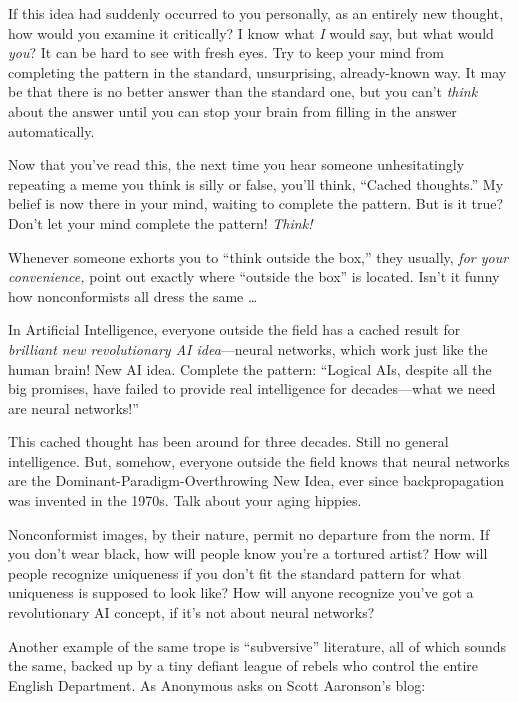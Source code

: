 {
 If this idea had suddenly occurred to you personally, as an
entirely new thought, how would you examine it critically? I know what
\textit{I} would say, but what would \textit{you}? It can be hard to
see with fresh eyes. Try to keep your mind from completing the pattern
in the standard, unsurprising, already-known way. It may be that there
is no better answer than the standard one, but you
can't \textit{think} about the answer until you can
stop your brain from filling in the answer automatically.}

{
 Now that you've read this, the next time you hear
someone unhesitatingly repeating a meme you think is silly or false,
you'll think, ``Cached
thoughts.'' My belief is now there in your mind,
waiting to complete the pattern. But is it true? Don't
let your mind complete the pattern! \textit{Think!}}

\myendsectiontext


{
 Whenever someone exhorts you to ``think outside
the box,'' they usually, \textit{for your
convenience,} point out exactly where ``outside the
box'' is located. Isn't it funny how
nonconformists all dress the same \ldots }

{
 In Artificial Intelligence, everyone outside the field has a
cached result for \textit{brilliant new revolutionary AI
idea}{}---neural networks, which work just like the human brain! New AI
idea. Complete the pattern: ``Logical AIs, despite all
the big promises, have failed to provide real intelligence for
decades---what we need are neural networks!''}

{
 This cached thought has been around for three decades. Still no
general intelligence. But, somehow, everyone outside the field knows
that neural networks are the Dominant-Paradigm-Overthrowing New Idea,
ever since backpropagation was invented in the 1970s. Talk about your
aging hippies.}

{
 Nonconformist images, by their nature, permit no departure from
the norm. If you don't wear black, how will people know
you're a tortured artist? How will people recognize
uniqueness if you don't fit the standard pattern for
what uniqueness is supposed to look like? How will anyone recognize
you've got a revolutionary AI concept, if
it's not about neural networks?}

{
 Another example of the same trope is
``subversive'' literature, all of
which sounds the same, backed up by a tiny defiant league of rebels who
control the entire English Department. As Anonymous asks on Scott
Aaronson's blog:}


